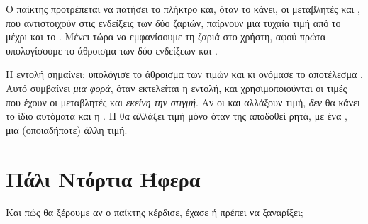 \documentclass[a4paper,11pt,oneside]{book}
\begin{document}
Ο παίκτης προτρέπεται να πατήσει το πλήκτρο  και, όταν το κάνει, οι μεταβλητές  και , που αντιστοιχούν στις ενδείξεις των δύο ζαριών, παίρνουν μια τυχαία τιμή από το  μέχρι και το . Μένει τώρα να εμφανίσουμε τη ζαριά στο χρήστη, αφού πρώτα υπολογίσουμε το άθροισμα των δύο ενδείξεων  και .


Η εντολή  σημαίνει: υπολόγισε το άθροισμα των τιμών  και  κι ονόμασε το αποτέλεσμα . Αυτό συμβαίνει \emph{μια φορά}, όταν εκτελείται η εντολή, και χρησιμοποιούνται οι τιμές που έχουν οι μεταβλητές  και  \emph{εκείνη την στιγμή}. 
Αν οι  και  αλλάξουν τιμή, \emph{δεν} θα κάνει το ίδιο αυτόματα και η . Η  θα αλλάξει τιμή μόνο όταν της αποδοθεί ρητά, με ένα \pyinline{=}, μια (οποιαδήποτε) άλλη τιμή.


\section{Πάλι Ντόρτια Ήφερα}

\begin{question}
Και πώς θα ξέρουμε αν ο παίκτης κέρδισε, έχασε ή πρέπει να ξαναρίξει;
\end{question}
\end{document}
